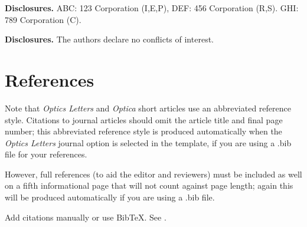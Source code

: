 \documentclass[9pt,twocolumn,twoside]{osajnl}
\begin{document}
\noindent\textbf{Disclosures.} ABC: 123 Corporation (I,E,P), DEF: 456 Corporation (R,S). GHI: 789 Corporation (C).

\medskip

\noindent\textbf{Disclosures.} The authors declare no conflicts of interest.

\section{References}

Note that \emph{Optics Letters} and \emph{Optica} short articles use an abbreviated reference style. Citations to journal articles should omit the article title and final page number; this abbreviated reference style is produced automatically when the \emph{Optics Letters} journal option is selected in the template, if you are using a .bib file for your references.

However, full references (to aid the editor and reviewers) must be included as well on a fifth informational page that will not count against page length; again this will be produced automatically if you are using a .bib file.

\bigskip
\noindent Add citations manually or use BibTeX. See \cite{Zhang:14,OSA,FORSTER2007,testthesis,manga_rao_single_2007}.



\end{document}
